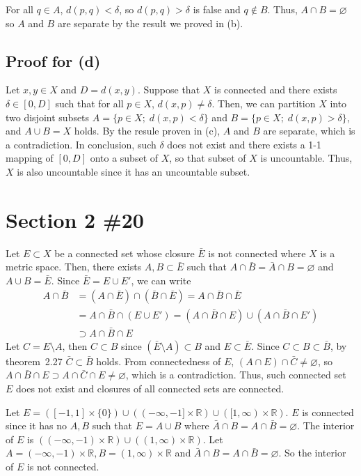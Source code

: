 \documentclass{scrartcl}
\begin{document}
For all \(q \in A\), \(d(p, q) < \delta\), so \(d(p, q) > \delta\) is false and \(q \not \in B\).
Thus, \(A \cap B = \varnothing\) so \(A\) and \(B\) are separate by the result we proved in (b).

\subsection{Proof for (d)}
Let \(x, y \in X\) and \(D = d(x, y)\).
Suppose that \(X\) is connected and there exists \(\delta \in [0, D]\) such that for all \(p \in X\), \(d(x, p) \not = \delta\).
Then, we can partition \(X\) into two disjoint subsets \(A = \{p \in X;\; d(x, p) < \delta\}\) and \(B = \{p \in X;\; d(x, p) > \delta\}\), and \(A \cup B = X\) holds.
By the resule proven in (c), \(A\) and \(B\) are separate, which is a contradiction.
In conclusion, such \(\delta\) does not exist and there exists a 1-1 mapping of \([0, D]\) onto a subset of \(X\), so that subset of \(X\) is uncountable.
Thus, \(X\) is also uncountable since it has an uncountable subset.

\section{Section 2 \#20}
Let \(E \subset X\) be a connected set whose closure \(\bar{E}\) is not connected where \(X\) is a metric space.
Then, there exists \(A, B \subset \bar{E}\) such that \(A \cap \bar{B} = \bar{A} \cap B = \varnothing\) and \(A \cup B = \bar{E}\).
Since \(\bar{E} = E \cup E'\), we can write
\begin{align*}
  A \cap \bar{B} &= (A \cap \bar{E}) \cap (\bar{B} \cap \bar{E}) = A \cap \bar{B} \cap \bar{E} \\
                 &= A \cap \bar{B} \cap (E \cup E') = (A \cap \bar{B} \cap E) \cup (A \cap \bar{B} \cap E') \\
                 &\supset A \cap \bar{B} \cap E
\end{align*}
Let \(C = E \setminus A\), then \(C \subset B\) since \((\bar{E} \setminus A) \subset B\) and \(E \subset \bar{E}\).
Since \(C \subset B \subset \bar{B}\), by theorem~2.27 \(\bar{C} \subset \bar{B}\) holds.
From connectedness of \(E\), \((A \cap E) \cap \bar{C} \not = \varnothing\), so \(A \cap \bar{B} \cap E \supset A \cap \bar{C} \cap E \not = \varnothing\), which is a contradiction.
Thus, such connected set \(E\) does not exist and closures of all connected sets are connected.

Let \(E = ([-1, 1] \times \{0\}) \cup ((-\infty, -1] \times \mathbb{R}) \cup ([1, \infty) \times \mathbb{R})\).
\(E\) is connected since it has no \(A, B\) such that \(E = A \cup B\) where \(\bar{A} \cap B = A \cap \bar{B} = \varnothing\).
The interior of \(E\) is \(((-\infty, -1) \times \mathbb{R}) \cup ((1, \infty) \times \mathbb{R})\).
Let \(A = (-\infty, -1) \times \mathbb{R}, B = (1, \infty) \times \mathbb{R}\) and \(\bar{A} \cap B = A \cap \bar{B} = \varnothing\).
So the interior of \(E\) is not connected.
\end{document}
